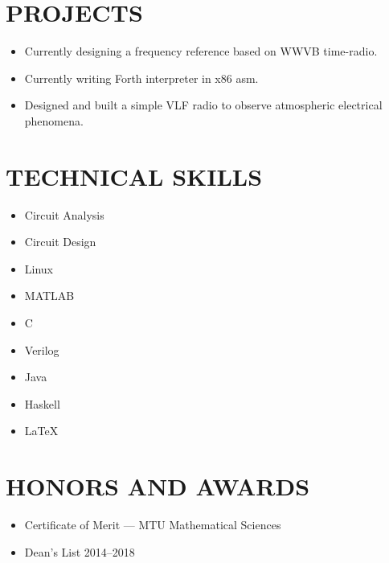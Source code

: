\documentclass[letterpaper]{res}
\begin{document}
\begin{resume}

  \section{PROJECTS}
  \begin{itemize}
	\item Currently designing a frequency reference based on WWVB time-radio.
	\item Currently writing Forth interpreter in x86 asm.
    \item Designed and built a simple VLF radio to observe atmospheric electrical phenomena.
  \end{itemize}

  \section{TECHNICAL SKILLS}
  \vspace{-1pt}
  \begin{multicols}{3}
    \begin{itemize} \itemsep1pt \parskip0pt 
      \item Circuit Analysis
	  \item Circuit Design
      \item Linux
      \item MATLAB
      \item C
      \item Verilog
      \item Java
      \item Haskell
      \item LaTeX
    \end{itemize}
  \end{multicols}

  \section{HONORS AND AWARDS}
  \begin{itemize}
    \item Certificate of Merit --- MTU Mathematical Sciences
    \item Dean's List 2014--2018
  \end{itemize}

\end{resume}
\end{document}
